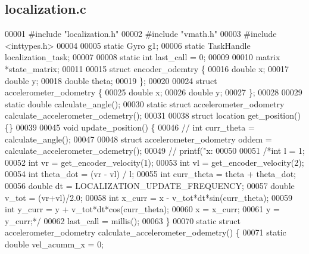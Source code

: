 \subsection{localization.\+c}
\label{localization_8c_source}

\begin{DoxyCode}
00001 \textcolor{preprocessor}{#include "localization.h"}
00002 \textcolor{preprocessor}{#include "vmath.h"}
00003 \textcolor{preprocessor}{#include <inttypes.h>}
00004 
00005 \textcolor{keyword}{static} Gyro g1;
00006 \textcolor{keyword}{static} TaskHandle localization_task;
00007 
00008 \textcolor{keyword}{static} \textcolor{keywordtype}{int} last_call = 0;
00009 
00010 matrix *state_matrix;
00011 
00015 \textcolor{keyword}{struct }encoder_odemtry \{
00016   \textcolor{keywordtype}{double} x;
00017   \textcolor{keywordtype}{double} y;
00018   \textcolor{keywordtype}{double} theta;
00019 \};
00020 
00024 \textcolor{keyword}{struct }accelerometer_odometry \{
00025   \textcolor{keywordtype}{double} x;
00026   \textcolor{keywordtype}{double} y;
00027 \};
00028 
00029 \textcolor{keyword}{static} \textcolor{keywordtype}{double} calculate_angle();
00030 \textcolor{keyword}{static} \textcolor{keyword}{struct }accelerometer_odometry calculate_accelerometer_odemetry();
00031 
00038 \textcolor{keyword}{struct }location get_position() \{\}
00039 
00045 \textcolor{keywordtype}{void} update_position() \{
00046   \textcolor{comment}{// int curr\_theta = calculate\_angle();}
00047 
00048   \textcolor{keyword}{struct }accelerometer_odometry oddem = calculate_accelerometer_odemetry();
00049   \textcolor{comment}{// printf("x: %
00050 
00051   \textcolor{comment}{/*int l = 1;}
00052 \textcolor{comment}{  int vr = get\_encoder\_velocity(1);}
00053 \textcolor{comment}{  int vl = get\_encoder\_velocity(2);}
00054 \textcolor{comment}{  int theta\_dot = (vr - vl) / l;}
00055 \textcolor{comment}{  int curr\_theta = theta + theta\_dot;}
00056 \textcolor{comment}{  double dt = LOCALIZATION\_UPDATE\_FREQUENCY;}
00057 \textcolor{comment}{  double v\_tot = (vr+vl)/2.0;}
00058 \textcolor{comment}{  int x\_curr = x - v\_tot*dt*sin(curr\_theta);}
00059 \textcolor{comment}{  int y\_curr = y + v\_tot*dt*cos(curr\_theta);}
00060 \textcolor{comment}{  x = x\_curr;}
00061 \textcolor{comment}{  y = y\_curr;*/}
00062   last_call = millis();
00063 \}
00070 \textcolor{keyword}{static} \textcolor{keyword}{struct }accelerometer_odometry calculate_accelerometer_odemetry() \{
00071   \textcolor{keyword}{static} \textcolor{keywordtype}{double} vel\_acumm\_x = 0;
}
\end{DoxyCode}

